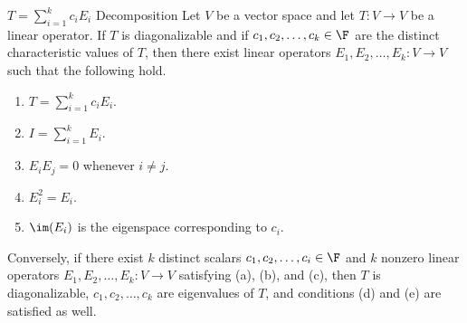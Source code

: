 \documentclass[math_245.tex]{subfiles}
\begin{document}
    \begin{theorem}{$T = \sum^{k}_{i=1} c_iE_i$ Decomposition}
        Let $V$ be a vector space and let $T:V\to V$ be a linear operator. If $T$ is diagonalizable and if $c_1, c_2, \ldots, c_k\in \F$ are the distinct characteristic values of $T$, then there exist linear operators $E_1, E_2, \ldots, E_k:V\to V$ such that the following hold.
        \begin{enumerate}
            \item $T = \sum^{k}_{i=1} c_iE_i$.
            \item $I = \sum^{k}_{i=1} E_i$.
            \item $E_iE_j = 0$ whenever $i\neq j$.
            \item $E_i^2 = E_i$.
            \item $\im(E_i)$ is the eigenspace corresponding to $c_i$.
        \end{enumerate}
        Conversely, if there exist $k$ distinct scalars $c_1, c_2, \ldots, c_i\in \F$ and $k$ nonzero linear operators $E_1, E_2, \ldots, E_k: V\to V$ satisfying (a), (b), and (c), then $T$ is diagonalizable, $c_1, c_2, \ldots, c_k$ are eigenvalues of $T$, and conditions (d) and (e) are satisfied as well.
    \end{theorem}
\end{document}
